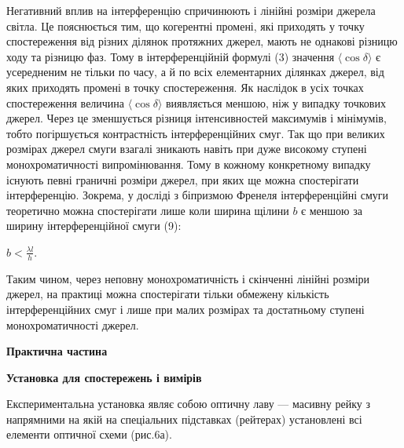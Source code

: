 \documentclass[12pt,a4paper]{article}
\begin{document}
    Негативний вплив на інтерференцію спричинюють і лінійні розміри
    джерела світла. Це пояснюється тим, що когерентні промені, які приходять у
    точку спостереження від різних ділянок протяжних джерел, мають не однакові різницю
    ходу та різницю фаз. Тому в інтерференційній формулі (3) значення
    $\langle \cos \delta \rangle$ є усередненим не тільки по часу, а й по всіх елементарних
    ділянках джерел, від яких приходять промені в точку спостереження.
    Як наслідок в усіх точках спостереження величина $\langle \cos \delta \rangle$ виявляється меншою, ніж
    у випадку точкових джерел. Через це зменшується різниця інтенсивностей
    максимумів і мінімумів, тобто погіршується контрастність інтерференційних
    смуг. Так що при великих розмірах джерел смуги взагалі зникають навіть при
    дуже високому ступені монохроматичності випромінювання. Тому в кожному конкретному
    випадку існують певні граничні розміри джерел, при яких ще можна спостерігати
    інтерференцію. Зокрема, у досліді з біпризмою Френеля інтерференційні смуги теоретично
    можна спостерігати лише коли ширина щілини $b$ є меншою за ширину інтерференційної смуги (9):

    \begin{center}
        $\displaystyle b < \frac{\lambda l}{h}$.
    \end{center}

    Таким чином, через неповну монохроматичність і скінченні лінійні
    розміри джерел, на практиці можна спостерігати тільки обмежену кількість
    інтерференційних смуг і лише при малих розмірах та достатньому ступені
    монохроматичності джерел.

    \newpage

    \begin{center}
        \textbf{\Large Практична частина}
    \end{center}

    \begin{center} \textbf{Установка для спостережень і вимірів} \end{center}

    Експериментальна установка являє собою оптичну лаву --- масивну рейку з напрямними
    на якій на спеціальних підставках (рейтерах) установлені всі елементи оптичної схеми
    (рис.6а).
\end{document}
